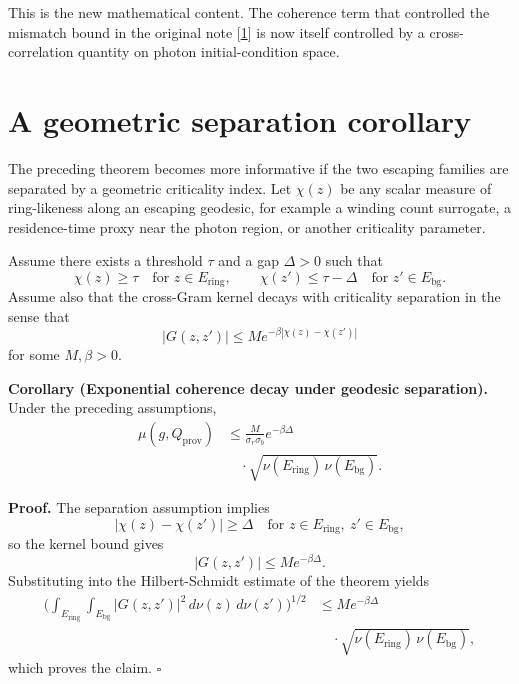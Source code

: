 \documentclass[10pt,letterpaper,twocolumn]{article}
\begin{document}
This is the new mathematical content. The coherence term that controlled the mismatch bound in the
original note [\hyperlink{ref-1}{1}] is now itself controlled by a cross-correlation quantity on photon
initial-condition space.

\section{A geometric separation corollary}

The preceding theorem becomes more informative if the two escaping families are separated by a geometric
criticality index. Let $\chi(z)$ be any scalar measure of ring-likeness along an escaping geodesic,
for example a winding count surrogate, a residence-time proxy near the photon region, or another criticality
parameter.

Assume there exists a threshold $\tau$ and a gap $\Delta>0$ such that
\[
\chi(z) \ge \tau \quad \text{for } z\in E_{\mathrm{ring}},
\qquad
\chi(z') \le \tau-\Delta \quad \text{for } z'\in E_{\mathrm{bg}}.
\]
Assume also that the cross-Gram kernel decays with criticality separation in the sense that
\[
|G(z,z')| \le M e^{-\beta |\chi(z)-\chi(z')|}
\]
for some $M,\beta>0$.

\par\smallskip\noindent{}\textbf{Corollary (Exponential coherence decay under geodesic separation).}
Under the preceding assumptions,
\begin{equation}
\begin{aligned}
\mu(g,Q_{\mathrm{prov}})
&\le
\frac{M}{\sigma_r\sigma_b} e^{-\beta\Delta} \\
&\quad \cdot \sqrt{\nu(E_{\mathrm{ring}})\,\nu(E_{\mathrm{bg}})}.
\end{aligned}
\end{equation}

\par\smallskip\noindent{}\textbf{Proof.} The separation assumption implies
\[
|\chi(z)-\chi(z')| \ge \Delta
\quad
\text{for } z\in E_{\mathrm{ring}},\ z'\in E_{\mathrm{bg}},
\]
so the kernel bound gives
\[
|G(z,z')| \le M e^{-\beta\Delta}.
\]
Substituting into the Hilbert-Schmidt estimate of the theorem yields
\begin{equation}
\begin{aligned}
\biggl(
\int_{E_{\mathrm{ring}}}\!\int_{E_{\mathrm{bg}}}
|G(z,z')|^2\,d\nu(z)\,d\nu(z')
\biggr)^{1/2}
&\le M e^{-\beta\Delta} \\
&\quad \cdot \sqrt{\nu(E_{\mathrm{ring}})\,\nu(E_{\mathrm{bg}})},
\end{aligned}
\end{equation}
which proves the claim.
\hfill$\square$
\end{document}
